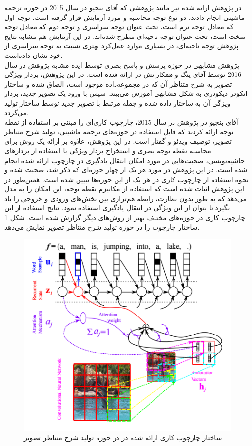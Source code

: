 در پژوهش ارائه شده نیز مانند پژوهشی که آقای بنجیو در سال 2015 در حوزه ترجمه ماشینی انجام دادند، دو نوع توجه محاسبه و مورد آزمایش قرار گرفته است. توجه اول که معادل توجه نرم است، تحت عنوان توجه سراسری و توجه دوم که معادل توجه سخت است، تحت عنوان توجه ناحیه‌ای مطرح شده‌اند. در این آزمایش هم مشابه نتایج پژوهش \cite{xu2015show} توجه ناحیه‌ای، در بسیاری موارد عمل‌کرد بهتری نسبت به توجه سراسری از خود نشان داده‌است.
\\
پژوهش مشابهی در حوزه پرسش و پاسخ بصری توسط ایده مشابه پژوهش \cite{luong2015effective} در سال 2016 توسط آقای ینگ و همکارانش در \cite{yang2016stacked} ارائه شده است. در این پژوهش، بردار ویژگی تصویر به شرح متناظر آن که در مجموعه‌داده موجود است، الصاق شده و ساختار انکودر-دیکودری به شکل مشابهی آموزش می‌بیند. سپس با ورود یک تصویر جدید، بردار ویژگی آن به ساختار داده شده و جمله مرتبط با تصویر جدید توسط ساختار تولید می‌گردد.
\\
آقای بنجیو در پژوهش \cite{cho2015describing} در سال 2015، چارچوب کاری‌ای را مبتنی بر استفاده از نقطه توجه ارائه کردند که قابل استفاده در حوزه‌های ترجمه ماشینی، تولید شرح متناظر تصویر، توصیف ویدئو و گفتار است. در این پژوهش، علاوه بر ارائه یک روش برای محاسبه نقطه توجه بصری و استخراج بردار ویژگی با استفاده از بردارهای حاشیه‌نویسی، صحبت‌هایی در مورد امکان انتقال یادگیری در چارچوب ارائه شده انجام شده است. در این پژوهش در مورد هر یک از چهار حوزه‌ای که ذکر شد، صحبت شده و نحوه استفاده از چارچوب کاری در هر یک از این حوزه‌ها تبیین شده است. همین‌طور در این پژوهش اثبات شده است که استفاده از مکانیزم نقطه توجه، این امکان را به مدل می‌دهد که به طور بدون نظارت، رابطه هم‌ترازی بین بخش‌های ورودی و خروجی را یاد بگیرد تا بتوان از این ویژگی در انتقال یادگیری استفاده نمود. نتایج استفاده از این چارچوب کاری در حوزه‌های مختلف بهتر از روش‌های دیگر گزارش شده است. شکل \ref{fig:5-abedfw} ساختار چارچوب را در حوزه تولید شرح متناظر تصویر نمایش می‌دهد.

\begin{figure}[h]
\centering
\includegraphics[scale=0.6]{Imgs/abedfw.png}
\caption{ساختار چارچوب کاری ارائه شده در \cite{cho2015describing} در حوزه تولید شرح متناظر تصویر}
\label{fig:5-abedfw}
\end{figure}



